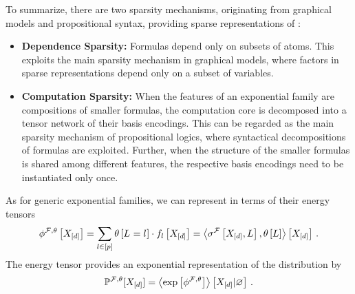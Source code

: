 
To summarize, there are two sparsity mechanisms, originating from graphical models and propositional syntax, providing sparse representations of \MarkovLogicNetwork{}:
\begin{itemize}
    \item \textbf{Dependence Sparsity:} Formulas depend only on subsets of atoms.
    This exploits the main sparsity mechanism in graphical models, where factors in sparse representations depend only on a subset of variables.
    \item \textbf{Computation Sparsity:}
    When the features of an exponential family are compositions of smaller formulas, the computation core is decomposed into a tensor network of their basis encodings.
    This can be regarded as the main sparsity mechanism of propositional logics, where syntactical decompositions of formulas are exploited.
    Further, when the structure of the smaller formulas is shared among different features, the respective basis encodings need to be instantiated only once.
\end{itemize}





As for generic exponential families, we can represent \MarkovLogicNetworks{} in terms of their energy tensors
\begin{align}
    \phi^{\mathcal{F},\theta}\left[X_{[d]}\right]
    = \sum_{l\in[p]} \theta\left[L_{}=l_{}\right] \cdot f_{l}\left[X_{[d]}\right]
    = \left\langle \sigma^{\mathcal{F}}\left[X_{[d]},L\right],\theta\left[L\right]\right\rangle \left[ X_{[d]} \right] \, .
\end{align}
The energy tensor provides an exponential representation of the distribution by
\begin{align}
    \mathbb{P}^{\mathcal{F},\theta}[X_{[d]}] = \left\langle \mathrm{exp}\left[\phi^{\mathcal{F},\theta}\right]\right\rangle \left[ X_{[d]} | \varnothing \right] \, .
\end{align}

